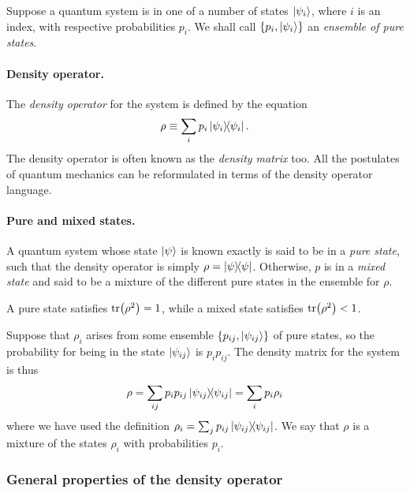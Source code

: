 \documentclass{article}
\numberwithin{theorem}{section}
\numberwithin{corollary}{section}
\numberwithin{postulate}{section}
\begin{document}
Suppose a quantum system is in one of a number of states $\ket{\psi_i}$, where
$i$ is an index, with respective probabilities $p_i$. We shall call $\{p_i,
\ket{\psi_i}\}$ an \emph{ensemble of pure states}.

\paragraph{Density operator.} The \emph{density operator} for the system is
defined by the equation \[
  \rho \equiv \sum_i p_i\op{\psi_i}.
\] The density operator is often known as the \emph{density matrix} too. All
the postulates of quantum mechanics can be reformulated in terms of the density
operator language.

\paragraph{Pure and mixed states.} A quantum system whose state $\ket{\psi}$ is
known exactly is said to be in a \emph{pure state}, such that the density
operator is simply $\rho = \op{\psi}$. Otherwise, $p$ is in a \emph{mixed
state} and said to be a mixture of the different pure states in the ensemble
for $\rho$.

A pure state satisfies $\tr(\rho^2) = 1$, while a mixed state satisfies
$\tr(\rho^2) < 1$.

Suppose that $\rho_i$ arises from some ensemble $\{p_{ij}, \ket{\psi_{ij}}\}$
of pure states, so the probability for being in the state $\ket{\psi_{ij}}$ is
$p_ip_{ij}$. The density matrix for the system is thus \[
  \rho = \sum_{ij} p_ip_{ij}\op{\psi_{ij}} = \sum_i p_i\rho_i
\] where we have used the definition $\rho_i = \sum_j p_{ij}\op{\psi_{ij}}$. We
say that $\rho$ is a mixture of the states $\rho_i$ with probabilities $p_i$.

\subsubsection{General properties of the density operator}
\end{document}
